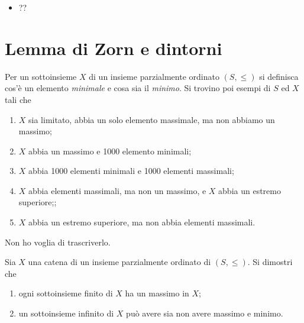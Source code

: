 \documentclass[a4paper]{article}\par \usepackage{style}\par
\begin{document}
\begin{itemize}[label = (iii) $ \Rightarrow $ (i)]
\item ??
\end{itemize}\par \section{Lemma di Zorn e dintorni}
\begin{es}
  Per un sottoinsieme $ X $ di un insieme parzialmente ordinato $ (S, \leq) $ si definisca cos'è un elemento \emph{minimale} e cosa sia il \emph{minimo}. Si trovino poi esempi di $ S $ ed $ X $ tali che
  \begin{enumerate}
  \item $ X $ sia limitato, abbia un solo elemento massimale, ma non abbiamo un massimo;
  \item $ X $ abbia un massimo e 1000 elemento minimali;
  \item $ X $ abbia 1000 elementi minimali e 1000 elementi massimali;
  \item $ X $ abbia elementi massimali, ma non un massimo, e $ X $ abbia un estremo superiore;;
  \item $ X $ abbia un estremo superiore, ma non abbia elementi massimali.
  \end{enumerate}
\end{es}
Non ho voglia di trascriverlo.\par \begin{es}
  Sia $ X $ una catena di un insieme parzialmente ordinato di $ (S, \leq) $. Si dimostri che
  \begin{enumerate}
  \item ogni sottoinsieme finito di $ X $ ha un massimo in $ X $;
  \item un sottoinsieme infinito di $ X $ può avere sia non avere massimo e minimo.
  \end{enumerate}
\end{es}
\end{document}
